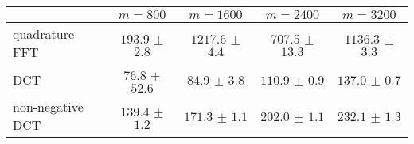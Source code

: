 \centering
\renewcommand{\arraystretch}{1.2}
\begin{tabular}{@{}lcccc@{}}
\toprule
 & $m=800$ & $m=1600$ & $m=2400$ & $m=3200$\\
\midrule
quadrature FFT & $193.9$ $\pm$ $2.8$ & $1217.6$ $\pm$ $4.4$ & $707.5$ $\pm$ $13.3$ & $1136.3$ $\pm$ $3.3$ \\
DCT & $76.8$ $\pm$ $52.6$ & $84.9$ $\pm$ $3.8$ & $110.9$ $\pm$ $0.9$ & $137.0$ $\pm$ $0.7$ \\
non-negative DCT & $139.4$ $\pm$ $1.2$ & $171.3$ $\pm$ $1.1$ & $202.0$ $\pm$ $1.1$ & $232.1$ $\pm$ $1.3$ \\
\bottomrule
\end{tabular}
